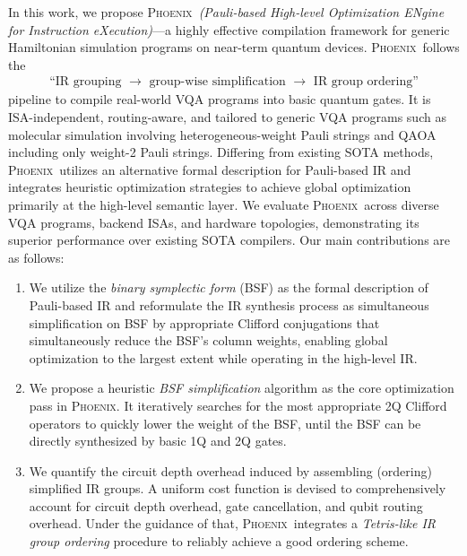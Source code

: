 \documentclass[conference,9pt]{IEEEtran}
\newcommand{\dquote}[1]{``#1''}
\newcommand{\phoenix}{\textsc{Phoenix}}
\begin{document}
    In this work, we propose \phoenix\ \emph{(Pauli-based High-level Optimization ENgine for Instruction eXecution)}---a highly effective compilation framework for generic Hamiltonian simulation programs on near-term quantum devices. \phoenix\ follows the 
    \begin{align*}
        \text{\dquote{IR grouping $\to$ group-wise simplification $\to$ IR group ordering}}
    \end{align*}
    pipeline to compile real-world VQA programs into basic quantum gates. It is ISA-independent, routing-aware, and tailored to generic VQA programs such as molecular simulation involving heterogeneous-weight Pauli strings and QAOA including only weight-2 Pauli strings. Differing from existing SOTA methods, \phoenix\ utilizes an alternative formal description for Pauli-based IR and integrates heuristic optimization strategies to achieve global optimization primarily at the high-level semantic layer. We evaluate \phoenix\ across diverse VQA programs, backend ISAs, and hardware topologies, demonstrating its superior performance over existing SOTA compilers. Our main contributions are as follows:
    \begin{enumerate}
        \item We utilize the \emph{binary symplectic form} (BSF) as the formal description of Pauli-based IR and reformulate the IR synthesis process as simultaneous simplification on BSF by appropriate Clifford conjugations that simultaneously reduce the BSF's column weights, enabling global optimization to the largest extent while operating in the high-level IR.
        \item We propose a heuristic \textit{BSF simplification} algorithm as the core optimization pass in \phoenix. It iteratively searches for the most appropriate 2Q Clifford operators to quickly lower the weight of the BSF, until the BSF can be directly synthesized by basic 1Q and 2Q gates.
        \item We quantify the circuit depth overhead induced by assembling (ordering) simplified IR groups. A uniform cost function is devised to comprehensively account for circuit depth overhead, gate cancellation, and qubit routing overhead. Under the guidance of that, \phoenix\ integrates a \emph{Tetris-like IR group ordering} procedure to reliably achieve a good ordering scheme.
    \end{enumerate}
\end{document}

